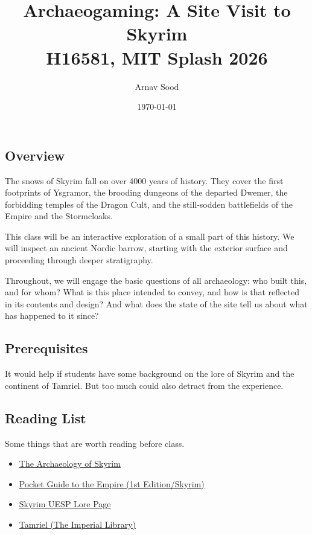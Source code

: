 \documentclass[12pt,oneside]{amsart}
\title{Archaeogaming: A Site Visit to Skyrim \\ H16581, MIT Splash 2026}
\author{Arnav Sood}
\date{\today}
\theoremstyle{definition}
\begin{document}
\maketitle

\subsection*{Overview} The snows of Skyrim fall on over 4000 years of history. They cover the first footprints of Ysgramor, the brooding dungeons of the departed Dwemer, the forbidding temples of the Dragon Cult, and the still-sodden battlefields of the Empire and the Stormcloaks.

This class will be an interactive exploration of a small part of this history. We will inspect an ancient Nordic barrow, starting with the exterior surface and proceeding through deeper stratigraphy.

Throughout, we will engage the basic questions of all archaeology: who built this, and for whom? What is this place intended to convey, and how is that reflected in its contents and design? And what does the state of the site tell us about what has happened to it since?

\subsection*{Prerequisites} It would help if students have some background on the lore of Skyrim and the continent of Tamriel. But too much could also detract from the experience.

\subsection*{Reading List} Some things that are worth reading before class.

\begin{itemize}
    \item \href{https://almostarchaeology.com/post/81028812252/the-archaeology-of-skyrim}{The Archaeology of Skyrim}
    \item \href{https://en.uesp.net/wiki/Lore:Pocket_Guide_to_the_Empire,_1st_Edition/Skyrim}{Pocket Guide to the Empire (1st Edition/Skyrim)}
    \item \href{https://en.uesp.net/wiki/Lore:Skyrim}{Skyrim UESP Lore Page}
    \item \href{https://www.imperial-library.info/articles/tamriel-timeline}{Tamriel (The Imperial Library)}
\end{itemize}

% 
% 
\end{document}
